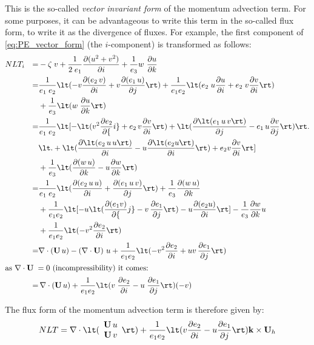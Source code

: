\documentclass[../main/NEMO_manual]{subfiles}
\begin{document}
This is the so-called \textit{vector invariant form} of the momentum advection term.
For some purposes, it can be advantageous to write this term in the so-called flux form,
\ie to write it as the divergence of fluxes.
For example, the first component of \autoref{eq:PE_vector_form} (the $i$-component) is transformed as follows:
\begin{alignat*}{2}
  &NLT_i &= &- \zeta \; v + \frac{1}{2 \; e_1} \pd[ (u^2 + v^2) ]{i} + \frac{1}{e_3} w \ \pd[u]{k} \\
  &      &=  &\frac{1}{e_1 \; e_2} \lt( -v \pd[(e_2 \, v)]{i} + v \pd[(e_1 \, u)]{j} \rt)
            + \frac{1}{e_1 e_2} \lt( e_2 \; u \pd[u]{i} + e_2 \; v \pd[v]{i} \rt) \\
  &      & &+ \frac{1}{e_3} \lt( w \; \pd[u]{k} \rt) \\
  &      &=  &\frac{1}{e_1 \; e_2} \lt[ - \lt( v^2 \pd[e_2]{i} + e_2 \, v \pd[v]{i} \rt)
                                     + \lt( \pd[ \lt( e_1 \, u \, v \rt)]{j} -         e_1 \, u \pd[v]{j} \rt) \rt. \\
  &      &                       &\lt. + \lt( \pd[ \lt( e_2 \, u \, u \rt)]{i} - u \pd[ \lt( e_2 u \rt)]{i} \rt)
                                     + e_2 v \pd[v]{i}                                                         \rt] \\
  &      & &+ \frac{1}{e_3} \lt( \pd[(w \, u)]{k} - u \pd[w]{k} \rt) \\
  &      &=  &\frac{1}{e_1 \; e_2} \lt( \pd[(e_2 \, u \, u)]{i} + \pd[(e_1 \, u \, v)]{j} \rt)
            + \frac{1}{e_3} \pd[(w \, u)]{k} \\
  &      & &+ \frac{1}{e_1 e_2} \lt[ - u \lt( \pd[(e_1 v)]{j} - v \, \pd[e_1]{j} \rt)
                                  - u \pd[(e_2 u)]{i}                              \rt]
            - \frac{1}{e_3} \pd[w]{k} u \\
  &      & &+ \frac{1}{e_1 e_2} \lt( - v^2 \pd[e_2]{i} \rt) \\
  &      &= &\nabla \cdot (\vect U \, u) - (\nabla \cdot \vect U) \ u
            + \frac{1}{e_1 e_2} \lt( -v^2 \pd[e_2]{i} + u v \, \pd[e_1]{j} \rt) \\
  \intertext{as $\nabla \cdot {\vect U} \; = 0$ (incompressibility) it comes:}
  &      &= &\, \nabla \cdot (\vect U \, u) + \frac{1}{e_1 e_2} \lt( v \; \pd[e_2]{i} - u \; \pd[e_1]{j} \rt) (-v)
\end{alignat*}

The flux form of the momentum advection term is therefore given by:
\begin{equation}
  \label{eq:PE_flux_form}
  NLT =   \nabla \cdot \lt(
    \begin{array}{*{20}c}
                            \vect U \, u \\
                            \vect U \, v
    \end{array}
                                         \rt)
        + \frac{1}{e_1 e_2} \lt( v \pd[e_2]{i} - u \pd[e_1]{j} \rt) \vect k \times \vect U_h
\end{equation}
\end{document}
